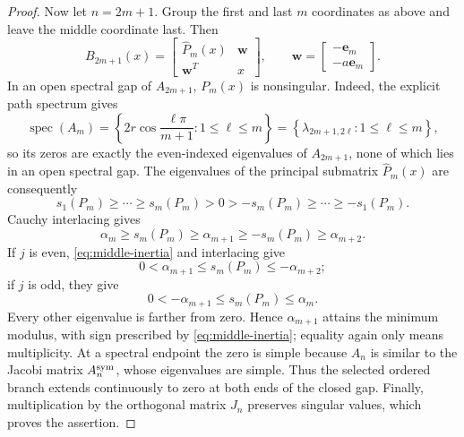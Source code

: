 \documentclass[12pt,anonymous]{iopjournal}
\numberwithin{equation}{section}
\theoremstyle{remark}
\begin{document}
\begin{proof}
Now let \(n=2m+1\).  Group the first and last \(m\) coordinates as
above and leave the middle coordinate last.  Then
\begin{equation}\label{eq:odd-dilation}
 B_{2m+1}(x)=
 \begin{bmatrix}\widehat P_m(x)&\boldsymbol w\\\boldsymbol w^T&x\end{bmatrix},
 \qquad
 \boldsymbol w=\begin{bmatrix}-\mathbf e_m\\-a\mathbf e_m\end{bmatrix}.
\end{equation}
In an open spectral gap of \(A_{2m+1}\), \(P_m(x)\) is nonsingular.  Indeed,
the explicit path spectrum gives
\[
 \operatorname{spec}(A_m)
 =\left\{2r\cos\frac{\ell\pi}{m+1}:1\leq\ell\leq m\right\}
 =\left\{\lambda_{2m+1,2\ell}:1\leq\ell\leq m\right\},
\]
so its zeros are exactly the even-indexed eigenvalues of \(A_{2m+1}\), none
of which lies in an open spectral gap.
The eigenvalues of the principal submatrix \(\widehat P_m(x)\) are
consequently
\[
 s_1(P_m)\geq\cdots\geq s_m(P_m)>0>
 -s_m(P_m)\geq\cdots\geq-s_1(P_m).
\]
Cauchy interlacing gives
\[
 \alpha_m\geq s_m(P_m)\geq\alpha_{m+1}
 \geq-s_m(P_m)\geq\alpha_{m+2}.
\]
If \(j\) is even, \eqref{eq:middle-inertia} and interlacing give
\[
 0<\alpha_{m+1}\leq s_m(P_m)\leq-\alpha_{m+2};
\]
if \(j\) is odd, they give
\[
 0<-\alpha_{m+1}\leq s_m(P_m)\leq\alpha_m.
\]
Every other eigenvalue is farther from zero.  Hence
\(\alpha_{m+1}\) attains the minimum modulus, with sign prescribed by
\eqref{eq:middle-inertia}; equality again only means multiplicity.  At a
spectral endpoint the zero is simple because \(A_n\) is similar to the
Jacobi matrix \(A_n^{\rm sym}\), whose eigenvalues are simple.  Thus the selected
ordered branch extends continuously to zero at both ends of the closed
gap.  Finally, multiplication by the orthogonal matrix \(J_n\) preserves
singular values, which proves the assertion.
\end{proof}
\end{document}
